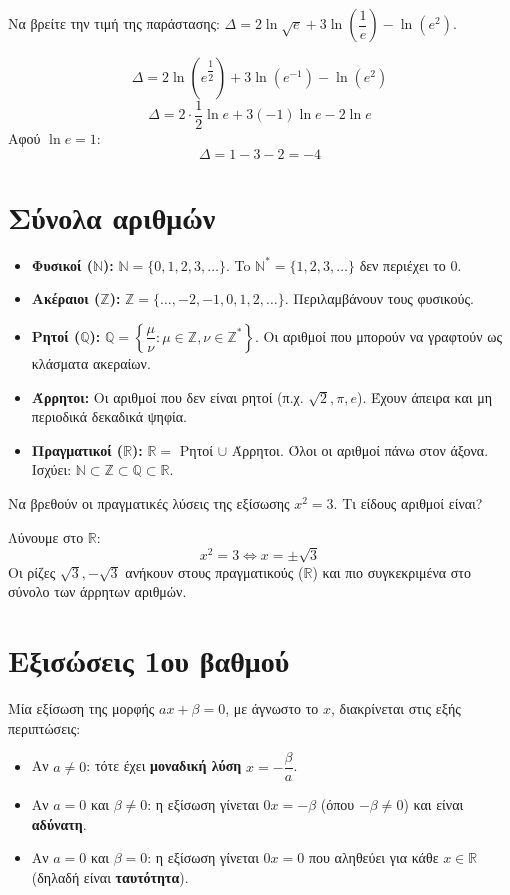 Να βρείτε την τιμή της παράστασης: $\Delta = 2\ln\sqrt{e} + 3\ln\left(\dfrac{1}{e}\right) - \ln(e^2)$.

\lysh
\[ \Delta = 2\ln(e^{\dfrac{1}{2}}) + 3\ln(e^{-1}) - \ln(e^2) \]
\[ \Delta = 2 \cdot \dfrac{1}{2}\ln e + 3(-1)\ln e - 2\ln e \]
Αφού $\ln e = 1$:
\[ \Delta = 1 - 3 - 2 = -4 \]

\section{Σύνολα αριθμών}

\begin{itemize}
    \item \textbf{Φυσικοί ($\mathbb{N}$):} $\mathbb{N} = \{0, 1, 2, 3, \dots\}$. To $\mathbb{N}^* = \{1, 2, 3, \dots\}$ δεν περιέχει το $0$.
    \item \textbf{Ακέραιοι ($\mathbb{Z}$):} $\mathbb{Z} = \{\dots, -2, -1, 0, 1, 2, \dots\}$. Περιλαμβάνουν τους φυσικούς.
    \item \textbf{Ρητοί ($\mathbb{Q}$):} $\mathbb{Q} = \left\lbrace \dfrac{\mu}{\nu} : \mu \in \mathbb{Z}, \nu \in \mathbb{Z}^*\right\rbrace .$ Οι αριθμοί που μπορούν να γραφτούν ως κλάσματα ακεραίων.
    \item \textbf{Άρρητοι:} Οι αριθμοί που δεν είναι ρητοί (π.χ. $\sqrt{2}, \pi, e$). Έχουν άπειρα και μη περιοδικά δεκαδικά ψηφία.
    \item \textbf{Πραγματικοί ($\mathbb{R}$):} $\mathbb{R} = $ Ρητοί $\cup$ Άρρητοι. Όλοι οι αριθμοί πάνω στον άξονα. Ισχύει: $\mathbb{N} \subset \mathbb{Z} \subset \mathbb{Q} \subset \mathbb{R}$.
\end{itemize}

Να βρεθούν οι πραγματικές λύσεις της εξίσωσης $x^2 = 3$. Τι είδους αριθμοί είναι?

\lysh
Λύνουμε στο $\mathbb{R}$:
\[ x^2 = 3 \Leftrightarrow x = \pm\sqrt{3} \]
Οι ρίζες $\sqrt{3}, -\sqrt{3}$ ανήκουν στους πραγματικούς ($\mathbb{R}$) και πιο συγκεκριμένα στο σύνολο των άρρητων αριθμών.

\section{Εξισώσεις 1ου βαθμού}

Μία εξίσωση της μορφής $a x + \beta = 0$, με άγνωστο το $x$, διακρίνεται στις εξής περιπτώσεις:
\begin{itemize}
    \item Αν $a \neq 0$: τότε έχει \textbf{μοναδική λύση} $x = -\dfrac{\beta}{a}$.
    \item Αν $a = 0$ και $\beta \neq 0$: η εξίσωση γίνεται $0x = -\beta$ (όπου $-\beta \neq 0$) και είναι \textbf{αδύνατη}.
    \item Αν $a = 0$ και $\beta = 0$: η εξίσωση γίνεται $0x = 0$ που αληθεύει για κάθε $x \in \mathbb{R}$ (δηλαδή είναι \textbf{ταυτότητα}).
\end{itemize}

